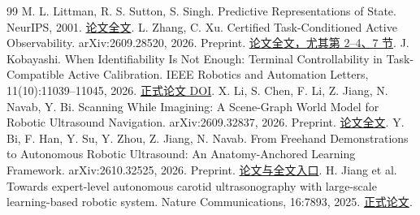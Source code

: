 \documentclass[11pt,a4paper,fontset=fandol]{ctexart}
\theoremstyle{definition}\newtheorem{definition}[theorem]{定义}
\theoremstyle{remark}\newtheorem{remark}[theorem]{说明}
\numberwithin{equation}{section}
\begin{document}
\begin{thebibliography}{99}
 M. L. Littman, R. S. Sutton, S. Singh.
Predictive Representations of State. NeurIPS, 2001.
\href{https://proceedings.neurips.cc/paper/2001/file/1e4d36177d71bbb3558e43af9577d70e-Paper.pdf}{论文全文}.
 L. Zhang, C. Xu. Certified Task-Conditioned Active Observability.
arXiv:2609.28520, 2026. Preprint.
\href{https://arxiv.org/pdf/2609.28520}{论文全文，尤其第 2--4、7 节}.
 J. Kobayashi. When Identifiability Is Not Enough: Terminal Controllability in Task-Compatible Active Calibration.
IEEE Robotics and Automation Letters, 11(10):11039--11045, 2026.
\href{https://doi.org/10.1109/LRA.2026.3719194}{正式论文 DOI}.
 X. Li, S. Chen, F. Li, Z. Jiang, N. Navab, Y. Bi.
Scanning While Imagining: A Scene-Graph World Model for Robotic Ultrasound Navigation.
arXiv:2609.32837, 2026. Preprint.
\href{https://arxiv.org/pdf/2609.32837}{论文全文}.
 Y. Bi, F. Han, Y. Su, Y. Zhou, Z. Jiang, N. Navab.
From Freehand Demonstrations to Autonomous Robotic Ultrasound: An Anatomy-Anchored Learning Framework.
arXiv:2610.32525, 2026. Preprint.
\href{https://arxiv.org/abs/2610.32525}{论文与全文入口}.
 H. Jiang et al. Towards expert-level autonomous carotid ultrasonography with large-scale learning-based robotic system.
Nature Communications, 16:7893, 2025.
\href{https://www.nature.com/articles/s41467-025-62865-w}{正式论文}.
\end{thebibliography}
\end{document}
